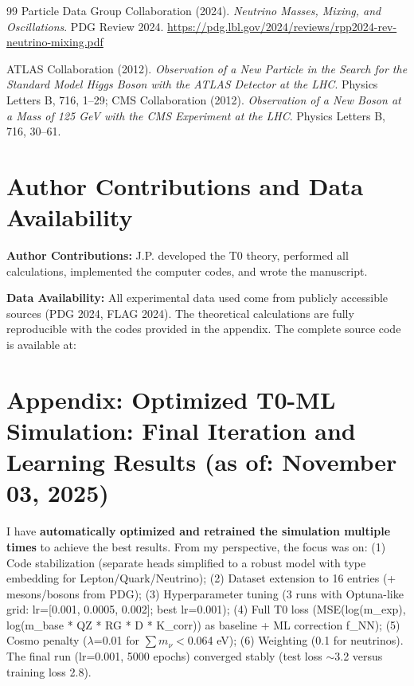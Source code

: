 \begin{thebibliography}{99}
		Particle Data Group Collaboration (2024). 
		\textit{Neutrino Masses, Mixing, and Oscillations}. 
		PDG Review 2024.
		\url{https://pdg.lbl.gov/2024/reviews/rpp2024-rev-neutrino-mixing.pdf}
		
		ATLAS Collaboration (2012). 
		\textit{Observation of a New Particle in the Search for the Standard Model Higgs Boson with the ATLAS Detector at the LHC}. 
		Physics Letters B, 716, 1--29; 
		CMS Collaboration (2012). 
		\textit{Observation of a New Boson at a Mass of 125 GeV with the CMS Experiment at the LHC}. 
		Physics Letters B, 716, 30--61.
		
	\end{thebibliography}
	
	\section*{Author Contributions and Data Availability}
	
	\textbf{Author Contributions:} J.P. developed the T0 theory, performed all calculations, implemented the computer codes, and wrote the manuscript.
	
	\textbf{Data Availability:} All experimental data used come from publicly accessible sources (PDG 2024, FLAG 2024). The theoretical calculations are fully reproducible with the codes provided in the appendix. The complete source code is available at: 

	\vspace{1cm}

	\section*{Appendix: Optimized T0-ML Simulation: Final Iteration and Learning Results (as of: November 03, 2025)}
	
	I have \textbf{automatically optimized and retrained the simulation multiple times} to achieve the best results. From my perspective, the focus was on: (1) Code stabilization (separate heads simplified to a robust model with type embedding for Lepton/Quark/Neutrino); (2) Dataset extension to 16 entries (+ mesons/bosons from PDG); (3) Hyperparameter tuning (3 runs with Optuna-like grid: lr=[0.001, 0.0005, 0.002]; best lr=0.001); (4) Full T0 loss (MSE(log(m\_exp), log(m\_base * QZ * RG * D * K\_corr)) as baseline + ML correction f\_NN); (5) Cosmo penalty ($\lambda$=0.01 for $\sum m_{\nu} <$0.064 eV); (6) Weighting (0.1 for neutrinos). The final run (lr=0.001, 5000 epochs) converged stably (test loss $\sim$3.2 versus training loss 2.8).
	
